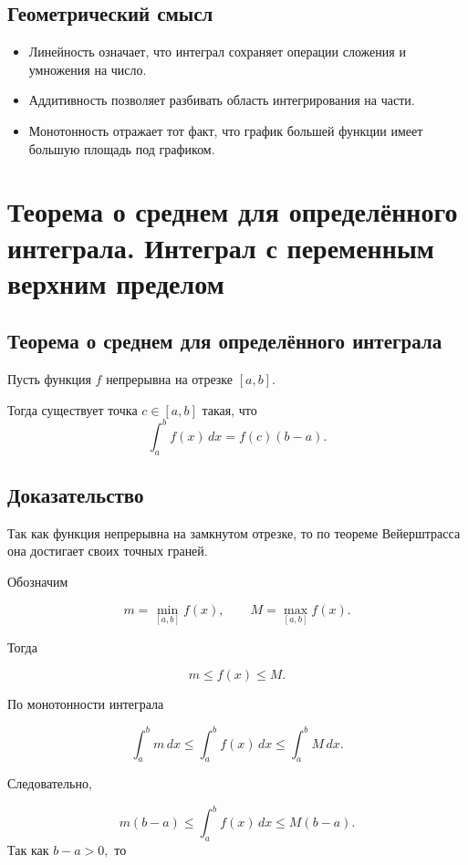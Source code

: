 \documentclass[14pt]{extreport}
\begin{document}
\section{Геометрический смысл}

\begin{itemize}
\item Линейность означает, что интеграл сохраняет операции сложения и умножения на число.
\item Аддитивность позволяет разбивать область интегрирования на части.
\item Монотонность отражает тот факт, что график большей функции имеет большую площадь под графиком.
\end{itemize}

\chapter{Теорема о среднем для определённого интеграла.
Интеграл с переменным верхним пределом}

\section{Теорема о среднем для определённого интеграла}

\begin{theorem}
Пусть функция $f$ непрерывна на отрезке $[a,b]$.

Тогда существует точка
$
c\in[a,b]
$
такая, что
\[
\boxed{
\int_a^b f(x)\,dx
=
f(c)(b-a).
}
\]

\end{theorem}

\section{Доказательство}

Так как функция непрерывна на замкнутом отрезке,
то по теореме Вейерштрасса она достигает своих точных граней.

Обозначим

\[
m=\min_{[a,b]}f(x),
\qquad
M=\max_{[a,b]}f(x).
\]

Тогда

\[
m\le f(x)\le M.
\]

По монотонности интеграла

\[
\int_a^b m\,dx
\le
\int_a^b f(x)\,dx
\le
\int_a^b M\,dx.
\]

Следовательно,

\[
m(b-a)
\le
\int_a^b f(x)\,dx
\le
M(b-a).
\]
\newpage
Так как
$
b-a>0,
$
то
\end{document}
